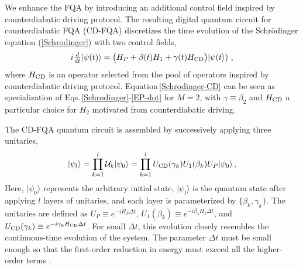 \documentclass[twocolumn,aps,superscriptaddress,floatfix,longbibliography]{revtex4-2}
\newcommand{\EQ}[1]{Equation\,\eqref{#1}}
\newcommand{\Eqs}[1]{Eqs.\,\eqref{#1}}
\begin{document}
We enhance the FQA by introducing an additional control field inspired by counterdiabatic driving protocol. The resulting digital
quantum circuit for counterdiabatic FQA (CD-FQA) 
discretizes the
time evolution of the Schr\"odinger equation (\ref{Schrodinger}) with two control fields,
\begin{equation}
  i\tfrac{d}{dt}|\psi(t)\rangle
  = \bigl(
       H_P + \beta(t) H_1 + \gamma(t) H_{\rm CD}
    \bigr)|\psi(t\rangle)
\text{ ,}\label{Schrodinger-CD}
\end{equation}
where $H_{\rm CD}$ is an operator selected from the pool of
operators inspired by counterdiabatic driving protocol. 
\EQ{Schrodinger-CD} can be seen as specialization
of \Eqs{Schrodinger}-\eqref{EP-dot} for $M=2$,
with $\gamma \equiv \beta_2$ and $H_{\rm CD}$
a particular choice for $H_2$ motivated from 
counterdiabatic driving.

The CD-FQA quantum circuit is assembled by successively applying
three unitaries,
\begin{equation}
   |\psi_{l}\rangle
   =\prod_{k=1}^l {\cal U}_k|\psi_{0}\rangle
   =\prod_{k=1}^l U_{\rm CD}(\gamma_k) U_1(\beta_k)  U_{P}|\psi_{0}\rangle
\,,\label{Falqon-1}
\end{equation}
Here, $|\psi_{0}\rangle$ represents the arbitrary initial state,
$|\psi_{l}\rangle$ is the quantum state after applying $l$
layers of unitaries, and each layer is parameterized by
$\{\beta_k,\gamma_k\}$. The unitaries are defined as $U_{P}\equiv
e^{-iH_{P}\Delta t}$, $U_{1}(\beta_{k})\equiv
e^{-i\beta_{k}H_{1}\Delta t}$, and $U_{\rm CD}(\gamma_{k})\equiv
e^{-i\gamma_{k}H_{\rm CD}\Delta t}$. For small $\Delta t$, this
evolution closely resembles the
continuous-time evolution of the system. The parameter $\Delta t$
must be small enough so that the first-order reduction in
energy must exceed all the higher-order terms
\cite{FeedbackPRA}. 
\end{document}
